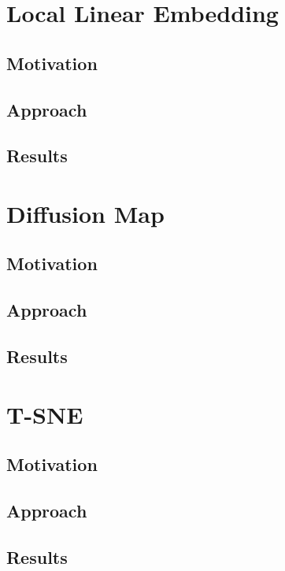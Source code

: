 \documentclass[12pt]{article}
\begin{document}
\section{Local Linear Embedding} \label{sec:Local Linear Embedding}

\subsection{Motivation}

\subsection{Approach}

\subsection{Results}

\section{Diffusion Map} \label{sec: Diffusion Map}

\subsection{Motivation}

\subsection{Approach}

\subsection{Results}

\section{T-SNE} \label{sec: T-SNE}
\subsection{Motivation}

\subsection{Approach}

\subsection{Results}
\end{document}
